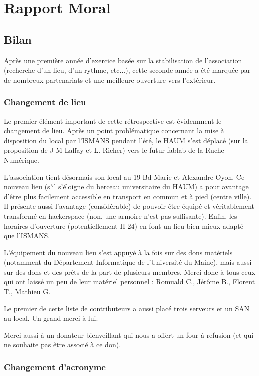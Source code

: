 \documentclass[a4paper, 11pt]{article}
\begin{document}
\section{Rapport Moral}


\subsection{Bilan}

Après une première année d'exercice basée sur la stabilisation de l'association (recherche d'un lieu, d'un rythme, etc...), cette seconde année a été marquée par de nombreux partenariats et une meilleure ouverture vers l'extérieur.

\subsubsection{Changement de lieu}

Le premier élément important de cette rétrospective est évidemment le changement de lieu.
Après un point problématique concernant la mise à disposition du local par l'ISMANS pendant l'été, le HAUM s'est déplacé (sur la proposition de J-M Laffay et L. Richer) vers le futur fablab de la Ruche Numérique.

L'association tient désormais son local au 19 Bd Marie et Alexandre Oyon. Ce nouveau lieu (s'il s'éloigne du berceau universitaire du HAUM) a pour avantage d'être plus facilement accessible en transport en commun et à pied (centre ville). Il présente aussi l'avantage (considérable) de pouvoir être équipé et véritablement transformé en hackerspace (non, une armoire n'est pas suffisante). Enfin, les horaires d'ouverture (potentiellement H-24) en font un lieu bien mieux adapté que l'ISMANS.

L'équipement du nouveau lieu s'est appuyé à la fois sur des dons matériels (notamment du Département Informatique de l'Université du Maine), mais aussi sur des dons et des prêts de la part de plusieurs membres. Merci donc à tous ceux qui ont laissé un peu de leur matériel personnel : Romuald C., Jérôme B., Florent T., Mathieu G.

Le premier de cette liste de contributeurs a aussi placé trois serveurs et un SAN au local. Un grand merci à lui.

Merci aussi à un donateur bienveillant qui nous a offert un four à refusion (et qui ne souhaite pas être associé à ce don).

\subsubsection{Changement d'acronyme}
\end{document}
